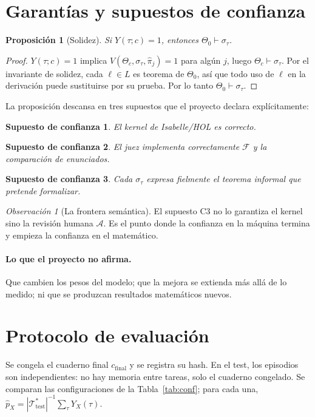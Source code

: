 \documentclass[11pt]{article}
\newtheorem{proposition}[definition]{Proposición}
\newtheorem{assumption}{Supuesto de confianza}
\theoremstyle{remark}
\newtheorem{remark}[definition]{Observación}
\newcommand{\T}{\mathcal{T}}
\newcommand{\F}{\mathcal{F}}
\newcommand{\A}{\mathcal{A}}
\newcommand{\1}{\mathbb{1}}
\begin{document}
\section{Garantías y supuestos de confianza}

\begin{proposition}[Solidez]
Si $Y(\tau;c)=1$, entonces $\Theta_0\vdash\sigma_\tau$.
\end{proposition}
\begin{proof}
$Y(\tau;c)=1$ implica $V(\Theta_c,\sigma_\tau,\hat\pi_j)=1$ para algún $j$, luego $\Theta_c\vdash\sigma_\tau$. Por el invariante de solidez, cada $\ell\in L$ es teorema de $\Theta_0$, así que todo uso de $\ell$ en la derivación puede sustituirse por su prueba. Por lo tanto $\Theta_0\vdash\sigma_\tau$.
\end{proof}

La proposición descansa en tres supuestos que el proyecto declara explícitamente:
\begin{assumption} El kernel de Isabelle/HOL es correcto.\end{assumption}
\begin{assumption} El juez implementa correctamente $\F$ y la comparación de enunciados.\end{assumption}
\begin{assumption} Cada $\sigma_\tau$ expresa fielmente el teorema informal que pretende formalizar.\end{assumption}

\begin{remark}[La frontera semántica]
El supuesto C3 no lo garantiza el kernel sino la revisión humana $\A$. Es el punto donde la confianza en la máquina termina y empieza la confianza en el matemático.
\end{remark}

\paragraph{Lo que el proyecto no afirma.} Que cambien los pesos del modelo; que la mejora se extienda más allá de lo medido; ni que se produzcan resultados matemáticos nuevos.

\section{Protocolo de evaluación}

Se congela el cuaderno final $c_{\mathrm{final}}$ y se registra su hash. En el test, los episodios son independientes: no hay memoria entre tareas, solo el cuaderno congelado. Se comparan las configuraciones de la Tabla~\ref{tab:conf}; para cada una,
$\hat p_X=|\T^*_{\mathrm{test}}|^{-1}\sum_{\tau}Y_X(\tau)$.
\end{document}
